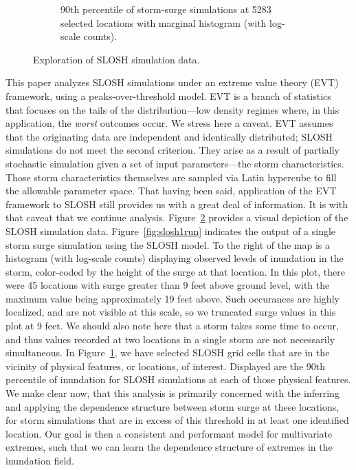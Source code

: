 \begin{figure}[t!]
\begin{subfigure}[t]{0.48\textwidth}
        \caption{
            90th percentile of storm-surge simulations at \num{5283} selected 
            locations with marginal histogram (with log-scale counts).
            \label{fig:sloshthreshold}}
    \end{subfigure}
    \caption{Exploration of SLOSH simulation data.\label{fig:sloshexplore}}
\end{figure}

This paper analyzes SLOSH simulations under an extreme value theory (EVT) framework, 
    using a peaks-over-threshold model.  EVT is a branch of statistics
    that focuses on the tails of the distribution---low density regimes where,
    in this application, the \emph{worst} outcomes occur.  
    We stress here a caveat. EVT assumes that the originating data are independent
    and identically distributed; SLOSH simulations do not meet the second criterion.
    They arise as a result of partially stochastic simulation given a set of input
    parameters---the storm characteristics.  Those storm characteristics themselves
    are sampled via Latin hypercube to fill the allowable parameter space.  That
    having been said, application of the EVT framework to SLOSH still provides us
    with a great deal of information.  It is with that caveat that we continue analysis.
    Figure~\ref{fig:sloshexplore} provides a visual depiction of the SLOSH 
    simulation data.  Figure~\ref{fig:slosh1run} indicates the output of a single 
    storm surge simulation using the SLOSH model. To the right of the map is a 
    histogram (with log-scale counts) displaying observed levels of inundation 
    in the storm, color-coded by the height of the surge at that location.  In this
    plot, there were 45 locations with surge greater than 9 feet above ground level,
    with the maximum value being approximately 19 feet above.  Such occurances
    are highly localized, and are not visible at this scale, so we truncated surge values
    in this plot at 9 feet.  We should also 
    note here that a storm takes some time to occur, and thus values recorded at 
    two locations in a single storm are not necessarily simultaneous.
    In Figure~\ref{fig:sloshthreshold}, we have selected SLOSH grid 
    cells that are in the vicinity of physical features, or locations, of 
    interest.  Displayed are the 90th percentile 
    of inundation for SLOSH simulations at each of those physical features.
    We make clear now, that this analysis is primarily concerned with the
    inferring and applying the dependence structure between storm surge at these locations,
    for storm simulations
    that are in excess of this threshold in at least one identified location.
    Our goal is then a consistent and performant model for multivariate extremes, 
    such that we can learn the dependence structure of extremes in the inundation field.

